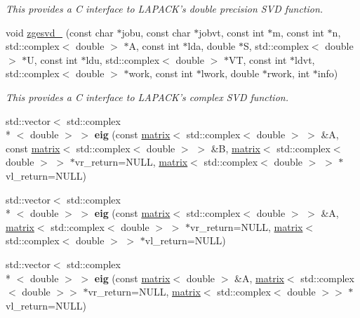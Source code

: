 \begin{DoxyCompactItemize}
\begin{DoxyCompactList}\small\item\em This provides a C interface to L\-A\-P\-A\-C\-K's double precision S\-V\-D function. \end{DoxyCompactList}\item 
\hypertarget{namespacekeycpp_afa5e2f74110f53bd288c15ce1f183f9b}{void \hyperlink{namespacekeycpp_afa5e2f74110f53bd288c15ce1f183f9b}{zgesvd\-\_\-} (const char $\ast$jobu, const char $\ast$jobvt, const int $\ast$m, const int $\ast$n, std\-::complex$<$ double $>$ $\ast$A, const int $\ast$lda, double $\ast$S, std\-::complex$<$ double $>$ $\ast$U, const int $\ast$ldu, std\-::complex$<$ double $>$ $\ast$V\-T, const int $\ast$ldvt, std\-::complex$<$ double $>$ $\ast$work, const int $\ast$lwork, double $\ast$rwork, int $\ast$info)}\label{namespacekeycpp_afa5e2f74110f53bd288c15ce1f183f9b}

\begin{DoxyCompactList}\small\item\em This provides a C interface to L\-A\-P\-A\-C\-K's complex S\-V\-D function. \end{DoxyCompactList}\item 
\hypertarget{namespacekeycpp_a61795f58aa135cfa0ebb4325f52f9de6}{std\-::vector$<$ std\-::complex\\*
$<$ double $>$ $>$ {\bfseries eig} (const \hyperlink{classkeycpp_1_1matrix}{matrix}$<$ std\-::complex$<$ double $>$ $>$ \&A, const \hyperlink{classkeycpp_1_1matrix}{matrix}$<$ std\-::complex$<$ double $>$ $>$ \&B, \hyperlink{classkeycpp_1_1matrix}{matrix}$<$ std\-::complex$<$ double $>$ $>$ $\ast$vr\-\_\-return=N\-U\-L\-L, \hyperlink{classkeycpp_1_1matrix}{matrix}$<$ std\-::complex$<$ double $>$ $>$ $\ast$vl\-\_\-return=N\-U\-L\-L)}\label{namespacekeycpp_a61795f58aa135cfa0ebb4325f52f9de6}

\item 
\hypertarget{namespacekeycpp_a4262bb0ca13c9c1e11732b9b1dab65c6}{std\-::vector$<$ std\-::complex\\*
$<$ double $>$ $>$ {\bfseries eig} (const \hyperlink{classkeycpp_1_1matrix}{matrix}$<$ std\-::complex$<$ double $>$ $>$ \&A, \hyperlink{classkeycpp_1_1matrix}{matrix}$<$ std\-::complex$<$ double $>$ $>$ $\ast$vr\-\_\-return=N\-U\-L\-L, \hyperlink{classkeycpp_1_1matrix}{matrix}$<$ std\-::complex$<$ double $>$ $>$ $\ast$vl\-\_\-return=N\-U\-L\-L)}\label{namespacekeycpp_a4262bb0ca13c9c1e11732b9b1dab65c6}

\item 
\hypertarget{namespacekeycpp_a9e462b40dbbb92e5ebef12956d76e1f8}{std\-::vector$<$ std\-::complex\\*
$<$ double $>$ $>$ {\bfseries eig} (const \hyperlink{classkeycpp_1_1matrix}{matrix}$<$ double $>$ \&A, \hyperlink{classkeycpp_1_1matrix}{matrix}$<$ std\-::complex$<$ double $>$$>$ $\ast$vr\-\_\-return=N\-U\-L\-L, \hyperlink{classkeycpp_1_1matrix}{matrix}$<$ std\-::complex$<$ double $>$$>$ $\ast$vl\-\_\-return=N\-U\-L\-L)}\label{namespacekeycpp_a9e462b40dbbb92e5ebef12956d76e1f8}


\end{DoxyCompactItemize}
